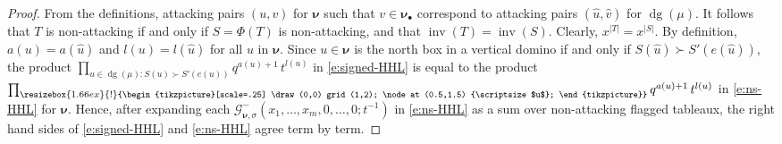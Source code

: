 \documentclass[12pt]{amsart}
\theoremstyle{definition}
\theoremstyle{remark}
\newcommand{\nubold}{{\boldsymbol \nu }}
\newcommand{\Gcal}{{\mathcal G}}
\newcommand{\uhat}{\widehat{u}}
\newcommand{\vhat}{\widehat{v}}
\newcommand{\sgngt}{\succ}
\newcommand{\baug}{\bullet }
\newcommand{\domino}{\begin{tikzpicture}[scale=.25]
\draw (0,0) grid (1,2);
\node at (0.5,1.5) {\scriptsize $u$};
\end{tikzpicture}}
\newcommand{\smalldomino}{\resizebox{1.66ex}{!}{\domino}}
\DeclareMathOperator{\dg}{dg}
\DeclareMathOperator{\inv}{inv}
\begin{document}
\begin{proof}
From the definitions, attacking pairs $(u,v)$ for $\nubold $ such that
$v \in \nubold _{\baug }$ correspond to attacking pairs $(\uhat ,\vhat
)$ for $\dg (\mu )$.  It follows that $T$ is non-attacking if and only
if $S = \Phi (T)$ is non-attacking, and that $\inv (T) = \inv (S)$.
Clearly, $x^{|T|} = x^{|S|}$.  By definition, $a(u) = a(\uhat )$ and
$l(u) = l(\uhat )$ for all $u$ in $\nubold $.  Since $u\in \nubold $
is the north box in a vertical domino if and only if $S(\uhat ) \sgngt
S'(e(\uhat ))$, the product $\prod _{u\in \dg (\mu ): S(u) \sgngt
S'(e(u))} q^{a(u)+1}\, t^{l(u)}$ in \eqref{e:signed-HHL} is equal to
the product $\prod _{\smalldomino } q^{a(u)+1}\,
t^{l(u)}$ in \eqref{e:ns-HHL} for $\nubold $.  Hence, after expanding
each $\Gcal _{\nubold ,\sigma }^{-} (x_{1}, \ldots, x_{m}, 0,\ldots,
0;t^{-1})$ in \eqref{e:ns-HHL} as a sum over non-attacking flagged
tableaux, the right hand sides of \eqref{e:signed-HHL} and
\eqref{e:ns-HHL} agree term by term.
\end{proof}
\end{document}
